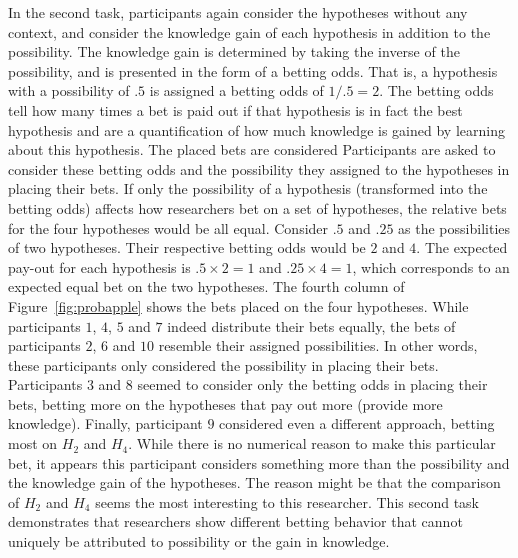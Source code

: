 \documentclass[man]{apa6}
\begin{document}
In the second task, participants again consider the hypotheses without any context, and consider the knowledge gain of each hypothesis in addition to the possibility.
The knowledge gain is determined by taking the inverse of the possibility, and is presented in the form of a betting odds.
That is, a hypothesis with a possibility of $.5$ is assigned a betting odds of $1/.5 = 2$.
The betting odds tell how many times a bet is paid out if that hypothesis is in fact the best hypothesis and are a quantification of how much knowledge is gained by learning about this hypothesis.
The placed bets are considered 
Participants are asked to consider these betting odds and the possibility they assigned to the hypotheses in placing their bets.
If only the possibility of a hypothesis (transformed into the betting odds) affects how researchers bet on a set of hypotheses, the relative bets for the four hypotheses would be all equal.
Consider $.5$ and $.25$ as the possibilities of two hypotheses. 
Their respective betting odds would be $2$ and $4$.
The expected pay-out for each hypothesis is $.5\times2=1$ and $.25\times4=1$, which corresponds to an expected equal bet on the two hypotheses.
The fourth column of Figure~\ref{fig:probapple} shows the bets placed on the four hypotheses.
While participants $1$, $4$, $5$ and $7$ indeed distribute their bets equally, the bets of participants $2$, $6$ and $10$ resemble their assigned possibilities.
In other words, these participants only considered the possibility in placing their bets.
Participants $3$ and $8$ seemed to consider only the betting odds in placing their bets, betting more on the hypotheses that pay out more (provide more knowledge).
Finally, participant $9$ considered even a different approach, betting most on $H_2$ and $H_4$.
While there is no numerical reason to make this particular bet, it appears this participant considers something more than the possibility and the knowledge gain of the hypotheses.
The reason might be that the comparison of $H_2$ and $H_4$ seems the most interesting to this researcher.
This second task demonstrates that researchers show different betting behavior that cannot uniquely be attributed to possibility or the gain in knowledge.
\end{document}
